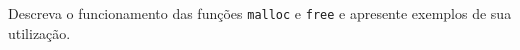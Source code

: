 Descreva o funcionamento das funções \texttt{malloc} e \texttt{free} e apresente exemplos de sua utilização.